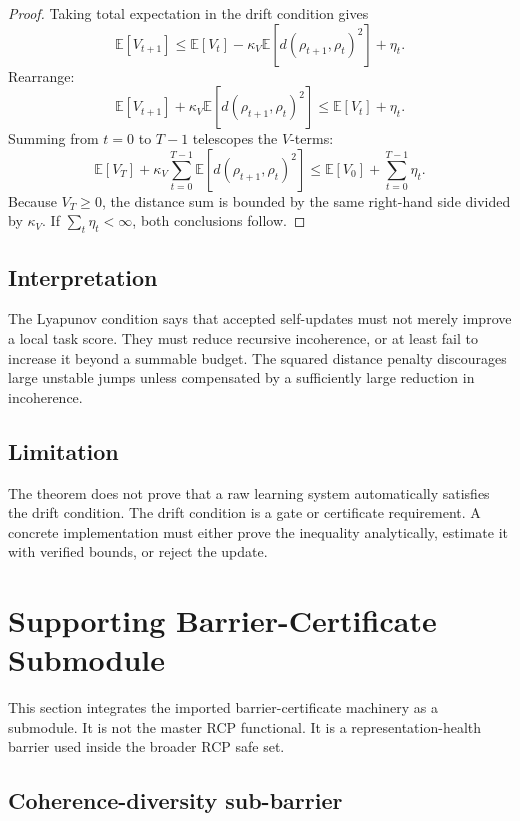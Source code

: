\documentclass[11pt]{article}
\newcommand{\1}{\mathbf{1}}
\begin{document}
\begin{proof}
Taking total expectation in the drift condition gives
\[
\mathbb E[V_{t+1}]
\le
\mathbb E[V_t]
-
\kappa_V\mathbb E[d(\rho_{t+1},\rho_t)^2]
+
\eta_t.
\]
Rearrange:
\[
\mathbb E[V_{t+1}]
+
\kappa_V\mathbb E[d(\rho_{t+1},\rho_t)^2]
\le
\mathbb E[V_t]+
\eta_t.
\]
Summing from \(t=0\) to \(T-1\) telescopes the \(V\)-terms:
\[
\mathbb E[V_T]
+
\kappa_V\sum_{t=0}^{T-1}\mathbb E[d(\rho_{t+1},\rho_t)^2]
\le
\mathbb E[V_0]+
\sum_{t=0}^{T-1}\eta_t.
\]
Because \(V_T\ge0\), the distance sum is bounded by the same right-hand side divided by \(\kappa_V\). If \(\sum_t\eta_t<\infty\), both conclusions follow.
\end{proof}

\subsection{Interpretation}

The Lyapunov condition says that accepted self-updates must not merely improve a local task score. They must reduce recursive incoherence, or at least fail to increase it beyond a summable budget. The squared distance penalty discourages large unstable jumps unless compensated by a sufficiently large reduction in incoherence.

\subsection{Limitation}

The theorem does not prove that a raw learning system automatically satisfies the drift condition. The drift condition is a gate or certificate requirement. A concrete implementation must either prove the inequality analytically, estimate it with verified bounds, or reject the update.

\section{Supporting Barrier-Certificate Submodule}

This section integrates the imported barrier-certificate machinery as a submodule. It is not the master RCP functional. It is a representation-health barrier used inside the broader RCP safe set.

\subsection{Coherence-diversity sub-barrier}
\end{document}
